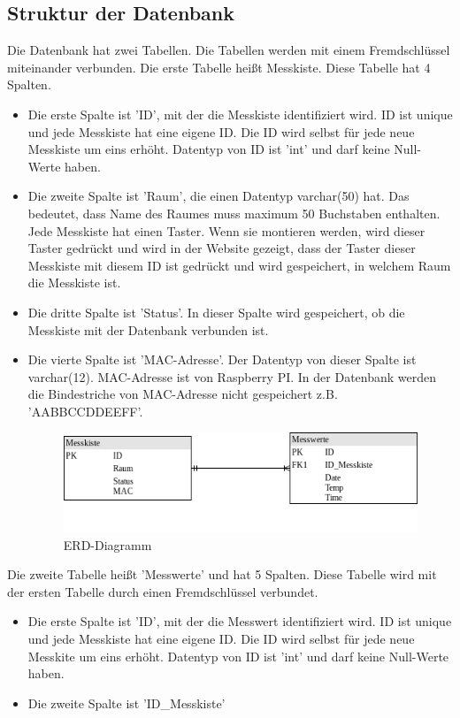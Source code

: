 	\subsection{Struktur der Datenbank}
	Die Datenbank hat zwei Tabellen. Die Tabellen werden mit einem Fremdschl\"ussel miteinander verbunden. Die erste Tabelle hei{\ss}t Messkiste. Diese Tabelle hat 4 Spalten. 
	\begin{itemize}
		\item Die erste Spalte ist 'ID', mit der die Messkiste identifiziert wird. ID ist unique und jede Messkiste hat eine eigene ID. Die ID wird selbst f\"ur jede neue Messkiste um eins erh\"oht. Datentyp von ID ist 'int' und darf keine Null-Werte haben. 
		\item Die zweite Spalte ist 'Raum', die einen Datentyp varchar(50) hat. Das bedeutet, dass Name des Raumes muss maximum 50 Buchstaben enthalten. Jede Messkiste hat einen Taster. Wenn sie montieren werden, wird dieser Taster gedr\"uckt und wird in der Website gezeigt, dass der Taster dieser Messkiste mit diesem ID ist gedr\"uckt und wird gespeichert, in welchem Raum die Messkiste ist.
		\item Die dritte Spalte ist 'Status'. In dieser Spalte wird gespeichert, ob die Messkiste mit der Datenbank verbunden ist. 
		\item Die vierte Spalte ist 'MAC-Adresse'. Der Datentyp von dieser Spalte ist varchar(12). MAC-Adresse ist von Raspberry PI. In der Datenbank werden die Bindestriche von MAC-Adresse nicht gespeichert z.B. 'AABBCCDDEEFF'.
		\begin{figure}
			\centering
			\includegraphics[scale=0.7]{./bilder/db.png}
			\caption{ERD-Diagramm}
			\label{fi:ERD}
		\end{figure} 
		\end{itemize}
	Die zweite Tabelle hei{\ss}t 'Messwerte' und hat 5 Spalten. Diese Tabelle wird mit der ersten Tabelle durch einen Fremdschl\"ussel verbundet.
	\begin{itemize}
		\item Die erste Spalte ist 'ID', mit der die Messwert identifiziert wird. ID ist unique und jede Messkiste hat eine eigene ID. Die ID wird selbst f\"ur jede neue Messkite um eins erh\"oht. Datentyp von ID ist 'int' und darf keine Null-Werte haben. 
		\item Die zweite Spalte ist 'ID_Messkiste'
	\end{itemize}